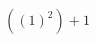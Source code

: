 \documentclass[preview]{standalone}
\begin{document}
\begin{align*}
\left( { \left(1\right) }^{2} \right) + 1
\end{align*}
\end{document}
